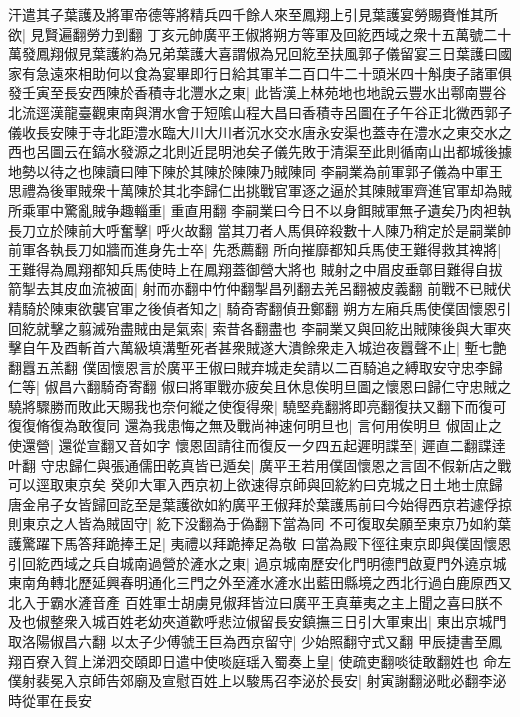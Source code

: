 汗遣其子葉護及將軍帝德等將精兵四千餘人來至鳳翔上引見葉護宴勞賜賚惟其所欲|{
	見賢遍翻勞力到翻}
丁亥元帥廣平王俶將朔方等軍及回紇西域之衆十五萬號二十萬發鳳翔俶見葉護約為兄弟葉護大喜謂俶為兄回紇至扶風郭子儀留宴三日葉護曰國家有急遠來相助何以食為宴畢即行日給其軍羊二百口牛二十頭米四十斛庚子諸軍俱發壬寅至長安西陳於香積寺北灃水之東|{
	此皆漢上林苑地也地說云豐水出鄠南豐谷北流逕漢龍臺觀東南與渭水會于短隂山程大昌曰香積寺呂圖在子午谷正北微西郭子儀收長安陳于寺北距澧水臨大川大川者沉水交水唐永安渠也蓋寺在澧水之東交水之西也呂圖云在鎬水發源之北則近昆明池矣子儀先敗于清渠至此則循南山出都城後據地勢以待之也陳讀曰陣下陳於其陳於陳陳乃賊陳同}
李嗣業為前軍郭子儀為中軍王思禮為後軍賊衆十萬陳於其北李歸仁出挑戰官軍逐之逼於其陳賊軍齊進官軍却為賊所乘軍中驚亂賊争趣輜重|{
	重直用翻}
李嗣業曰今日不以身餌賊軍無孑遺矣乃肉袒執長刀立於陳前大呼奮擊|{
	呼火故翻}
當其刀者人馬俱碎殺數十人陳乃稍定於是嗣業帥前軍各執長刀如牆而進身先士卒|{
	先悉薦翻}
所向摧靡都知兵馬使王難得救其禆將|{
	王難得為鳳翔都知兵馬使時上在鳳翔蓋御營大將也}
賊射之中眉皮垂鄣目難得自拔箭掣去其皮血流被面|{
	射而亦翻中竹仲翻掣昌列翻去羌呂翻被皮義翻}
前戰不已賊伏精騎於陳東欲襲官軍之後偵者知之|{
	騎奇寄翻偵丑鄭翻}
朔方左廂兵馬使僕固懷恩引回紇就擊之翦滅殆盡賊由是氣索|{
	索昔各翻盡也}
李嗣業又與回紇出賊陳後與大軍夾擊自午及酉斬首六萬級填溝塹死者甚衆賊遂大潰餘衆走入城迨夜囂聲不止|{
	塹七艶翻囂五羔翻}
僕固懷恩言於廣平王俶曰賊弃城走矣請以二百騎追之縛取安守忠李歸仁等|{
	俶昌六翻騎奇寄翻}
俶曰將軍戰亦疲矣且休息俟明旦圖之懷恩曰歸仁守忠賊之驍將驟勝而敗此天賜我也奈何縱之使復得衆|{
	驍堅堯翻將即亮翻復扶又翻下而復可復復脩復為敢復同}
還為我患悔之無及戰尚神速何明旦也|{
	言何用俟明旦}
俶固止之使還營|{
	還從宣翻又音如字}
懷恩固請往而復反一夕四五起遲明諜至|{
	遲直二翻諜逹叶翻}
守忠歸仁與張通儒田乾真皆已遁矣|{
	廣平王若用僕固懷恩之言固不假新店之戰可以逕取東京矣}
癸卯大軍入西京初上欲速得京師與回紇約曰克城之日土地士庶歸唐金帛子女皆歸回訖至是葉護欲如約廣平王俶拜於葉護馬前曰今始得西京若遽俘掠則東京之人皆為賊固守|{
	紇下没翻為于偽翻下當為同}
不可復取矣願至東京乃如約葉護驚躍下馬答拜跪捧王足|{
	夷禮以拜跪捧足為敬}
曰當為殿下徑往東京即與僕固懷恩引回紇西域之兵自城南過營於滻水之東|{
	過京城南歷安化門明德門啟夏門外遶京城東南角轉北歷延興春明通化三門之外至滻水滻水出藍田縣境之西北行過白鹿原西又北入于霸水滻音產}
百姓軍士胡虜見俶拜皆泣曰廣平王真華夷之主上聞之喜曰朕不及也俶整衆入城百姓老幼夾道歡呼悲泣俶留長安鎮撫三日引大軍東出|{
	東出京城門取洛陽俶昌六翻}
以太子少傅虢王巨為西京留守|{
	少始照翻守式又翻}
甲辰捷書至鳳翔百寮入賀上涕泗交頤即日遣中使啖庭瑶入蜀奏上皇|{
	使疏吏翻啖徒敢翻姓也}
命左僕射裴冕入京師告郊廟及宣慰百姓上以駿馬召李泌於長安|{
	射寅謝翻泌毗必翻李泌時從軍在長安}
